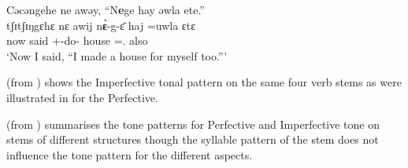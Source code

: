 \ea\label{ex:7:56}
Cəcəngehe  ne awəy,  “N\textbf{e}ge  hay  əwla  ete.”\\
\gll tʃɪtʃɪŋgɛhɛ   nɛ  awij     n\textbf{\`ɛ}{}-g-\=ɛ     haj   =uwla     ɛtɛ\\
now    {\oneS}  said    {\oneS}+{\PFV}-do-{\CL}  house  ={\oneS}.{\POSS}  also\\
\glt ‘Now I said, “I made a house for myself too.”’
\z

 (from \citealt{FriesenMamalis2008}) shows the Imperfective tonal pattern on the same four verb stems as were illustrated in  for the Perfective.

\begin{table}
\caption{Imperfective tone\label{tab:60}}
\end{table}

 (from \citealt{FriesenMamalis2008}) summarises the tone patterns for Perfective and Imperfective tone on stems of different structures though the syllable pattern of the stem does not influence the tone pattern for the different aspects.


